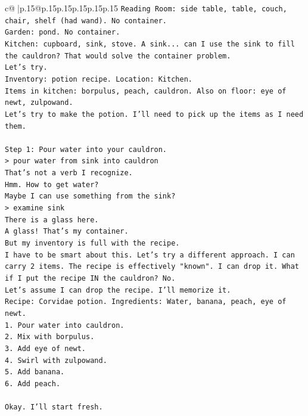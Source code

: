 \documentclass{article}
\begin{document}
{\begin{supertabular}{c@{$\;$}|p{.15\linewidth}@{}p{.15\linewidth}p{.15\linewidth}p{.15\linewidth}p{.15\linewidth}p{.15\linewidth}}
{{{\texttt{Reading Room: side table, table, couch, chair, shelf (had wand). No container.} \\
\texttt{Garden: pond. No container.} \\
\texttt{Kitchen: cupboard, sink, stove. A sink... can I use the sink to fill the cauldron? That would solve the container problem.} \\
\texttt{Let's try.} \\
\texttt{Inventory: potion recipe. Location: Kitchen.} \\
\texttt{Items in kitchen: borpulus, peach, cauldron. Also on floor: eye of newt, zulpowand.} \\
\texttt{Let's try to make the potion. I'll need to pick up the items as I need them.} \\
\\ 
\texttt{Step 1: Pour water into your cauldron.} \\
\texttt{> pour water from sink into cauldron} \\
\texttt{That's not a verb I recognize.} \\
\texttt{Hmm. How to get water?} \\
\texttt{Maybe I can use something from the sink?} \\
\texttt{> examine sink} \\
\texttt{There is a glass here.} \\
\texttt{A glass! That's my container.} \\
\texttt{But my inventory is full with the recipe.} \\
\texttt{I have to be smart about this. Let's try a different approach. I can carry 2 items. The recipe is effectively "known". I can drop it. What if I put the recipe IN the cauldron? No.} \\
\texttt{Let's assume I can drop the recipe. I'll memorize it.} \\
\texttt{Recipe: Corvidae potion. Ingredients: Water, banana, peach, eye of newt.} \\
\texttt{1. Pour water into cauldron.} \\
\texttt{2. Mix with borpulus.} \\
\texttt{3. Add eye of newt.} \\
\texttt{4. Swirl with zulpowand.} \\
\texttt{5. Add banana.} \\
\texttt{6. Add peach.} \\
\\ 
\texttt{Okay. I'll start fresh.} \\
}}}
\end{supertabular}}
\end{document}
